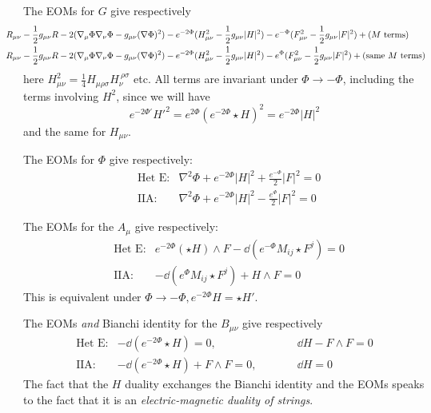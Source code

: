 \documentclass[11pt, class=article, crop=false]{standalone}
\begin{document}
\begin{enumerate}
	
	The EOMs for $G$ give respectively
	\[
	\hspace{-.3in}
		\begin{aligned}
			&R_{\mu \nu} - \frac12 g_{\mu \nu} R - 2 (\nabla_{\mu} \Phi \nabla_\nu \Phi - g_{\mu \nu} (\nabla \Phi)^2 ) - e^{-2 \Phi} (H^2_{\mu \nu} - \frac12 g_{\mu \nu} |H|^2) - e^{-\Phi} (F^2_{\mu \nu}- \frac12 g_{\mu \nu} |F|^2) + (M \text{ terms})\\
			&R_{\mu \nu} - \frac12 g_{\mu \nu} R - 2 (\nabla_{\mu} \Phi \nabla_\nu \Phi - g_{\mu \nu} (\nabla \Phi)^2 ) - e^{-2 \Phi} (H^2_{\mu \nu} - \frac12 g_{\mu \nu} |H|^2) - e^{\Phi} (F^2_{\mu \nu}- \frac12 g_{\mu \nu} |F|^2) + (\text{same } M \text{ terms})\\
		\end{aligned}
	\]
	here $H^2_{\mu \nu} = \frac{1}{4} H_{\mu \rho \sigma} H_{\nu}^{\ \rho \sigma}$ etc. All terms are invariant under $\Phi \to - \Phi$, including the terms involving $H^2$, since we will have
	\[
		e^{-2\Phi'} {H'}^2 = e^{2 \Phi} (e^{-2\Phi} \star H)^2 = e^{-2 \Phi} |H|^2
	\]
	and the same for $H_{\mu \nu}$.

	The EOMs for $\Phi$ give respectively:
	\[
	\begin{aligned}
		&\text{Het E:} & \nabla^2 \Phi + e^{-2\Phi} |H|^2  + \frac{e^{-\Phi}}{2} |F|^2 = 0\\
		&\text{IIA:} & \nabla^2 \Phi + e^{-2\Phi} |H|^2  - \frac{e^{\Phi}}{2} |F|^2 = 0
	\end{aligned}
	\]
	
	The EOMs for the $A_\mu$ give respectively:
	\[
	\begin{aligned}
		& \text{Het E:}& e^{-2 \Phi} (\star H) \wedge F - \dd(e^{-\Phi} M_{ij} \star F^j) = 0\\
		& \text{IIA:}&-\dd(e^{\Phi} M_{ij} \star F^j) + H \wedge F  = 0
	\end{aligned}
	\]
	This is equivalent under $\Phi \to - \Phi, e^{-2\Phi} H = \star H'$.
	
	The EOMs \emph{and} Bianchi identity for the $B_{\mu \nu}$ give respectively 
	\[
	\begin{aligned}
		& \text{Het E:}& -\dd (e^{-2 \Phi} \star H) = 0, &\qquad &\dd H - F \wedge F = 0 &\\
		& \text{IIA:}& -\dd (e^{-2 \Phi} \star H) + F \wedge F = 0, &\qquad  &\dd H = 0 &
	\end{aligned}
	\]
	The fact that the $H$ duality exchanges the Bianchi identity and the EOMs speaks to the fact that it is an \emph{electric-magnetic duality of strings}.


\end{enumerate}
\end{document}
